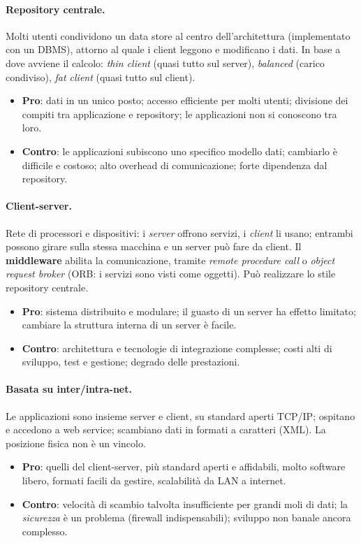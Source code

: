 \documentclass[a4paper,12pt]{article}
\begin{document}
\paragraph{Repository centrale.} Molti utenti condividono un data store al centro
dell'architettura (implementato con un DBMS), attorno al quale i client leggono e
modificano i dati. In base a dove avviene il calcolo: \emph{thin client} (quasi tutto sul
server), \emph{balanced} (carico condiviso), \emph{fat client} (quasi tutto sul client).
\begin{itemize}
  \item \textbf{Pro}: dati in un unico posto; accesso efficiente per molti utenti;
        divisione dei compiti tra applicazione e repository; le applicazioni non si
        conoscono tra loro.
  \item \textbf{Contro}: le applicazioni subiscono uno specifico modello dati; cambiarlo
        è difficile e costoso; alto overhead di comunicazione; forte dipendenza dal
        repository.
\end{itemize}

\paragraph{Client-server.} Rete di processori e dispositivi: i \emph{server} offrono
servizi, i \emph{client} li usano; entrambi possono girare sulla stessa macchina e un
server può fare da client. Il \textbf{middleware} abilita la comunicazione, tramite
\emph{remote procedure call} o \emph{object request broker} (ORB: i servizi sono visti
come oggetti). Può realizzare lo stile repository centrale.
\begin{itemize}
  \item \textbf{Pro}: sistema distribuito e modulare; il guasto di un server ha effetto
        limitato; cambiare la struttura interna di un server è facile.
  \item \textbf{Contro}: architettura e tecnologie di integrazione complesse; costi alti
        di sviluppo, test e gestione; degrado delle prestazioni.
\end{itemize}

\paragraph{Basata su inter/intra-net.} Le applicazioni sono insieme server e client, su
standard aperti TCP/IP; ospitano e accedono a web service; scambiano dati in formati a
caratteri (XML). La posizione fisica non è un vincolo.
\begin{itemize}
  \item \textbf{Pro}: quelli del client-server, più standard aperti e affidabili,
        molto software libero, formati facili da gestire, scalabilità da LAN a internet.
  \item \textbf{Contro}: velocità di scambio talvolta insufficiente per grandi moli di
        dati; la \emph{sicurezza} è un problema (firewall indispensabili); sviluppo non
        banale ancora complesso.
\end{itemize}
\end{document}
